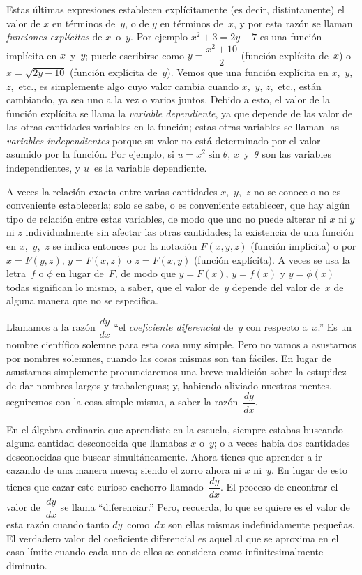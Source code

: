 \documentclass[12pt]{book}[2005/09/16]
\newcommand{\DPPageSep}[2]{\Pagelabel{#2}}
\newcommand{\Pagelabel}[1]
  {\phantomsection\label{#1}}
\begin{document}
Estas últimas expresiones establecen explícitamente (es decir, distintamente)
el valor de $x$ en términos de~$y$, o de $y$ en términos
de~$x$, y por esta razón se llaman \emph{funciones
explícitas} de $x$~o~$y$. Por ejemplo $x^2 + 3 = 2y - 7$ es
una función implícita en $x$~y~$y$; puede escribirse como
$y = \dfrac{x^2 + 10}{2}$ (función explícita de~$x$) o $x = \sqrt{2y - 10}$
(función explícita de~$y$). Vemos que una función explícita
en $x$,~$y$, $z$,~etc., es simplemente algo cuyo
valor cambia cuando $x$,~$y$, $z$,~etc., están
cambiando, ya sea uno a la vez o varios juntos.
Debido a esto, el valor de la función explícita se
llama la \emph{variable dependiente}, ya que depende de las
valor de las otras cantidades variables en la función;
\DPPageSep{027.png}{15}%
estas otras variables se llaman las \emph{variables
independientes}\Pagelabel{indvar} porque su valor no está determinado por
el valor asumido por la función. Por ejemplo,
si $u = x^2 \sin \theta$, $x$~y~$\theta$ son las variables independientes,
y $u$~es la variable dependiente.

A veces la relación exacta entre varias
cantidades $x$,~$y$,~$z$ no se conoce o no es
conveniente establecerla; solo se sabe, o es conveniente
establecer, que hay algún tipo de relación
entre estas variables, de modo que uno no puede alterar
ni $x$ ni $y$ ni $z$ individualmente sin afectar las otras
cantidades; la existencia de una función en $x$,~$y$,~$z$ se
indica entonces por la notación\Pagelabel{notation} $F(x, y, z)$ (función
implícita) o por $x = F(y, z)$, $y = F(x, z)$ o $z = F(x, y)$
(función explícita). A veces se usa la letra~$f$ o $\phi$
en lugar de~$F$, de modo que $y = F(x)$, $y = f(x)$ y $y = \phi(x)$
todas significan lo mismo, a saber, que el valor de~$y$
depende del valor de~$x$ de alguna manera que no se
especifica.

Llamamos a la razón $\dfrac{dy}{dx}$ ``el \emph{coeficiente diferencial} de~$y$
con respecto a~$x$.'' Es un nombre científico solemne
para esta cosa muy simple. Pero no vamos
a asustarnos por nombres solemnes, cuando las cosas
mismas son tan fáciles. En lugar de asustarnos
simplemente pronunciaremos una breve maldición sobre la
estupidez de dar nombres largos y trabalenguas; y, habiendo
aliviado nuestras mentes, seguiremos con la cosa simple
misma, a saber la razón~$\dfrac{dy}{dx}$.
\DPPageSep{028.png}{16}%

En el álgebra ordinaria que aprendiste en la escuela,
siempre estabas buscando alguna cantidad desconocida
que llamabas $x$ o~$y$; o a veces
había dos cantidades desconocidas que buscar
simultáneamente. Ahora tienes que aprender a ir
cazando de una manera nueva; siendo el zorro ahora ni
$x$ ni~$y$. En lugar de esto tienes que cazar este
curioso cachorro llamado~$\dfrac{dy}{dx}$. El proceso de encontrar el
valor de~$\dfrac{dy}{dx}$ se llama ``diferenciar.'' Pero, recuerda,
lo que se quiere es el valor de esta razón cuando tanto
$dy$~como~$dx$ son ellas mismas indefinidamente pequeñas. El
verdadero valor del coeficiente diferencial es aquel al que
se aproxima en el caso límite cuando cada uno de
ellos se considera como infinitesimalmente diminuto.
\end{document}
